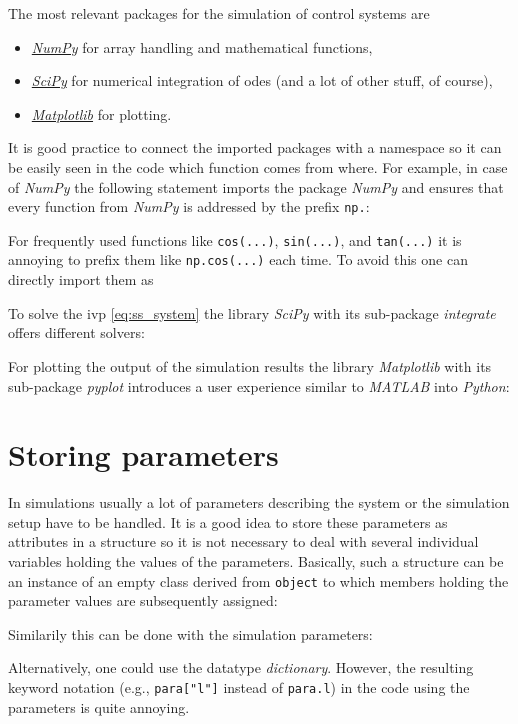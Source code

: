 \documentclass[a4paper,11pt,headinclude=true,headsepline,parskip=half,DIV=13]{scrartcl}
\newcommand{\listcode}[3]{}
\newcommand{\listcodeplot}[2]{\listcode{#1}{#2}{../sim/01_car_example_plotting.py}}
\newcommand{\py}{\emph{Python}\xspace}
\newcommand{\scipy}{\emph{SciPy}\xspace}
\newcommand{\numpy}{\emph{NumPy}\xspace}
\newcommand{\mpl}{\emph{Matplotlib}\xspace}
\begin{document}
The most relevant packages for the simulation of control systems are

\begin{itemize}
\item \href{http://www.numpy.org/}{\numpy} for array handling and mathematical functions,
\item \href{https://docs.scipy.org/doc/scipy/reference/}{\scipy} for numerical integration of \glspl{ode} (and a lot of other stuff, of course),
\item \href{https://matplotlib.org/}{\mpl} for plotting.
\end{itemize}

It is good practice to connect the imported packages with a namespace so it can be easily seen in the code which function comes from where. For example, in case of \numpy the following statement imports the package \numpy and ensures that every function from \numpy is addressed by the prefix \texttt{np.}:
\listcodeplot{2}{2}
For frequently used functions like \texttt{cos(...)}, \texttt{sin(...)}, and \texttt{tan(...)} it is annoying to prefix them like \texttt{np.cos(...)} each time. To avoid this one can directly import them as 
\listcodeplot{3}{3}
To solve the \gls{ivp} \eqref{eq:ss_system} the library \scipy with its sub-package \emph{integrate} offers different solvers:
\listcodeplot{4}{4}
For plotting the output of the simulation results the library \mpl with its sub-package \emph{pyplot} introduces a user experience similar to \emph{MATLAB} into \py:
\listcodeplot{5}{5}


\section{Storing parameters}
In simulations usually a lot of parameters describing the system or the simulation setup have to be handled. It is a good idea to store these parameters as attributes in a structure so it is not necessary to deal with several individual variables holding the values of the parameters. Basically, such a structure can be an instance of an empty class derived from \texttt{object} to which members holding the parameter values are subsequently assigned:
\listcodeplot{8}{15}
Similarily this can be done with the simulation parameters:
\listcodeplot{17}{21}

Alternatively, one could use the datatype \emph{dictionary}. However, the resulting keyword notation (e.g., \texttt{para["l"]} instead of \texttt{para.l}) in the code using the parameters is quite annoying.
\end{document}

